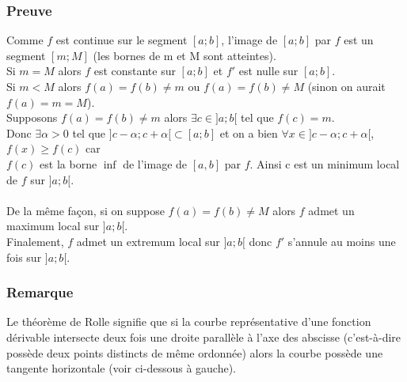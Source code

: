 \documentclass[a4paper,10pt]{book} %
\begin{document}
\subsubsection{Preuve}
Comme $f$ est continue sur le segment $[a;b]$, l'image de $[a;b]$ par $f$ est un segment $[m;M]$ (les bornes de m et M sont atteintes).\\

Si $m=M$ alors $f$ est constante sur $[a;b]$ et $f'$ est nulle sur $[a;b]$.\\

Si $m<M$ alors $f(a)=f(b)\neq m$ ou $f(a)=f(b)\neq M$ (sinon on aurait $f(a)=m=M$).\\
Supposons $f(a)=f(b)\neq m$ alors $\exists c \in ]a;b[$ tel que $f(c)=m$.\\

Donc $\exists \alpha>0$ tel que $]c-\alpha;c+\alpha[ \subset[a;b]$ et on a bien $\forall x\in ]c-\alpha;c+\alpha[$, $f(x)\geq f(c)$ car\\
$f(c)$ est la borne $\inf$ de l'image de $[a,b]$ par $f$. Ainsi c est un minimum local de $f$ sur $]a;b[$.\\\\
De la même façon, si on suppose $f(a)=f(b)\neq M$ alors $f$ admet un maximum local sur $]a;b[$.\\

Finalement, $f$ admet un extremum local sur $]a;b[$ donc $f'$ s'annule au moins une fois sur $]a;b[$.

\subsubsection{Remarque}
Le théorème de Rolle signifie que si la courbe représentative d'une fonction dérivable intersecte deux fois une droite parallèle à l'axe des abscisse (c'est-à-dire possède deux points distincts de même ordonnée) alors la courbe possède une tangente horizontale (voir ci-dessous à gauche).\\
\end{document}
